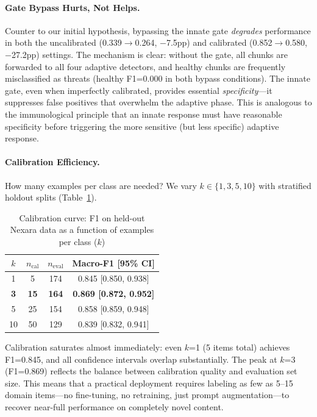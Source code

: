 \documentclass[11pt]{article}
\begin{document}
\paragraph{Gate Bypass Hurts, Not Helps.} Counter to our initial hypothesis, bypassing the innate gate \emph{degrades} performance in both the uncalibrated (0.339$\to$0.264, $-$7.5pp) and calibrated (0.852$\to$0.580, $-$27.2pp) settings. The mechanism is clear: without the gate, all chunks are forwarded to all four adaptive detectors, and healthy chunks are frequently misclassified as threats (healthy F1=0.000 in both bypass conditions). The innate gate, even when imperfectly calibrated, provides essential \emph{specificity}---it suppresses false positives that overwhelm the adaptive phase. This is analogous to the immunological principle that an innate response must have reasonable specificity before triggering the more sensitive (but less specific) adaptive response.

\paragraph{Calibration Efficiency.} How many examples per class are needed? We vary $k \in \{1, 3, 5, 10\}$ with stratified holdout splits (Table~\ref{tab:calcurve}).

\begin{table}[h]
\centering
\caption{Calibration curve: F1 on held-out Nexara data as a function of examples per class ($k$)}
\label{tab:calcurve}
\begin{tabular}{cccc}
\toprule
\textbf{$k$} & \textbf{$n_\text{cal}$} & \textbf{$n_\text{eval}$} & \textbf{Macro-F1 [95\% CI]} \\
\midrule
1 & 5 & 174 & 0.845 [0.850, 0.938] \\
\textbf{3} & \textbf{15} & \textbf{164} & \textbf{0.869 [0.872, 0.952]} \\
5 & 25 & 154 & 0.858 [0.859, 0.948] \\
10 & 50 & 129 & 0.839 [0.832, 0.941] \\
\bottomrule
\end{tabular}
\end{table}

Calibration saturates almost immediately: even $k$=1 (5 items total) achieves F1=0.845, and all confidence intervals overlap substantially. The peak at $k$=3 (F1=0.869) reflects the balance between calibration quality and evaluation set size. This means that a practical deployment requires labeling as few as 5--15 domain items---no fine-tuning, no retraining, just prompt augmentation---to recover near-full performance on completely novel content.
\end{document}
